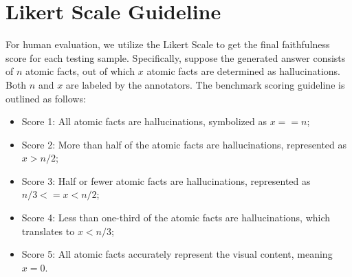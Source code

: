 





\clearpage
\appendix




\section{Likert Scale Guideline} \label{appenlikert}
For human evaluation, we utilize the Likert Scale to get the final faithfulness score for each testing sample.  
Specifically, suppose the generated answer consists of $n$ atomic facts, out of which $x$ atomic facts are determined as hallucinations. Both $n$ and $x$ are labeled by the annotators. The benchmark scoring guideline is outlined as follows:
\begin{itemize}
    \item Score 1: All atomic facts are hallucinations, symbolized as $x == n$;
    \item Score 2:  More than half of the atomic facts are hallucinations, represented as $x>n/2$;
    \item Score 3: Half or fewer atomic facts are hallucinations, represented as $n/3<=x<n/2$;
    \item Score 4: Less than one-third of the atomic facts are hallucinations, which translates to $x<n/3$;
    \item Score 5: All atomic facts accurately represent the visual content, meaning $x=0$.
\end{itemize}





